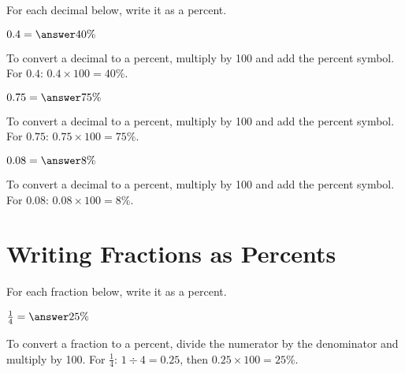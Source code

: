 \documentclass{ximera}
\begin{document}
For each decimal below, write it as a percent.


\begin{problem}
$0.4 = \answer{40\%}$

\begin{feedback}
To convert a decimal to a percent, multiply by 100 and add the percent symbol. For $0.4$: $0.4 \times 100 = 40\%$.
\end{feedback}

\end{problem}

\begin{problem}
$0.75 = \answer{75\%}$

\begin{feedback}
To convert a decimal to a percent, multiply by 100 and add the percent symbol. For $0.75$: $0.75 \times 100 = 75\%$.
\end{feedback}

\end{problem}

\begin{problem}
$0.08 = \answer{8\%}$

\begin{feedback}
To convert a decimal to a percent, multiply by 100 and add the percent symbol. For $0.08$: $0.08 \times 100 = 8\%$.
\end{feedback}

\end{problem}



\section*{Writing Fractions as Percents}

For each fraction below, write it as a percent.

\begin{problem}
$\frac{1}{4} = \answer{25\%}$

\begin{feedback}
To convert a fraction to a percent, divide the numerator by the denominator and multiply by 100. For $\frac{1}{4}$: $1 \div 4 = 0.25$, then $0.25 \times 100 = 25\%$.
\end{feedback}

\end{problem}
\end{document}

